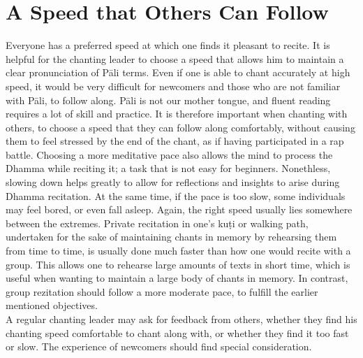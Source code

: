 \section{A Speed that Others Can Follow}
Everyone has a preferred speed at which one finds it pleasant to recite. It is helpful for the chanting leader to choose a speed that allows him to maintain a clear pronunciation of Pāli terms. Even if one is able to chant accurately at high speed, it would be very difficult for newcomers and those who are not familiar with Pāli, to follow along. Pāli is not our mother tongue, and fluent reading requires a lot of skill and practice. It is therefore important when chanting with others, to choose a speed that they can follow along comfortably, without causing them to feel stressed by the end of the chant, as if having participated in a rap battle. Choosing a more meditative pace also allows the mind to process the Dhamma while reciting it; a task that is not easy for beginners. Nonethless, slowing down helps greatly to allow for reflections and insights to arise during Dhamma recitation. At the same time, if the pace is too slow, some individuals may feel bored, or even fall asleep. Again, the right speed usually lies somewhere between the extremes. Private recitation in one’s kuṭi or walking path, undertaken for the sake of maintaining chants in memory by rehearsing them from time to time, is usually done much faster than how one would recite with a group. This allows one to rehearse large amounts of texts in short time, which is useful when wanting to maintain a large body of chants in memory. In contrast, group rezitation should follow a more moderate pace, to fulfill the earlier mentioned objectives.\\

A regular chanting leader may ask for feedback from others, whether they find his chanting speed comfortable to chant along with, or whether they find it too fast or slow. The experience of newcomers should find special consideration.\\

